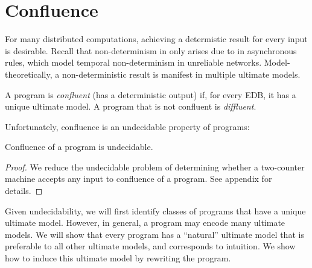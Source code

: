 \section{Confluence}

For many distributed computations, achieving a determistic result for every input is desirable.  Recall that non-determinism in \lang only arises due to  in asynchronous rules, 
which model temporal non-determinism in unreliable networks.
Model-theoretically, a non-deterministic result is manifest in multiple ultimate models.

\begin{definition}
A \lang program is {\em confluent} (has a deterministic output) if, for every EDB, it has a unique ultimate model.  A program that is not confluent is {\em diffluent}.
\end{definition}

Unfortunately, confluence is an undecidable property of \lang programs:

\begin{lemma}
\label{lem:confluence-undecidable}
Confluence of a \lang program is undecidable.
\end{lemma}
\begin{proof}
We reduce the undecidable problem of determining whether a two-counter machine accepts any input to confluence of a \lang program.  See appendix for details.
\end{proof}

Given undecidability, we will first identify classes of programs that have a unique ultimate model.  However, in general, a \lang program may encode many ultimate models.  We will show that every \lang program has a ``natural'' ultimate model that is preferable to all other ultimate models, and corresponds to intuition.  We show how to induce this ultimate model by rewriting the program.


